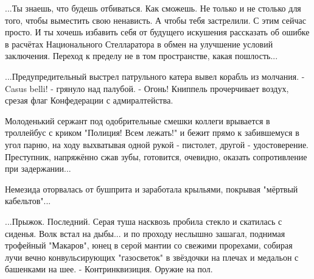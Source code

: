 ...Ты знаешь, что будешь отбиваться. Как сможешь. Не только и не столько для того, чтобы выместить свою ненависть. А чтобы тебя застрелили. С этим сейчас просто. И ты хочешь избавить себя от будущего искушения рассказать об ошибке в расчётах Национального Стелларатора в обмен на улучшение условий заключения. Переход к пределу не в том пространстве, какая пошлость...

...Предупредительный выстрел патрульного катера вывел корабль из молчания.
 - Casus belli! - грянуло над палубой. - Огонь!
Книппель прочерчивает воздух, срезая флаг Конфедерации с адмиралтейства.

Молоденький сержант под одобрительные смешки коллеги врывается в троллейбус с криком "Полиция! Всем лежать!" и бежит прямо к забившемуся в угол парню, на ходу выхватывая одной рукой - пистолет, другой - удостоверение. Преступник, напряжённо сжав зубы, готовится, очевидно, оказать сопротивление при задержании...

Немезида оторвалась от бушприта и заработала крыльями, покрывая "мёртвый кабельтов"...

...Прыжок. Последний. Серая туша насквозь пробила стекло и скатилась с сиденья. Волк встал на дыбы... и по проходу неслышно зашагал, поднимая трофейный "Макаров", юнец в серой мантии со свежими прорехами, собирая лучи вечно конвульсирующих "газосветок" в звёздочки на плечах и медальон с башенками на шее.
 - Контринквизиция. Оружие на пол.



